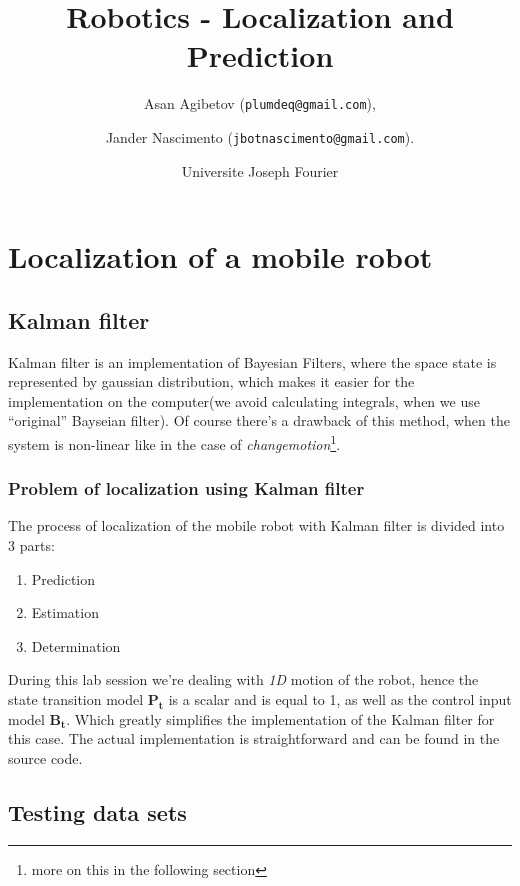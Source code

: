 \documentclass{article}
\begin{document}
\title{Robotics - Localization and Prediction}

\author{Asan Agibetov (\texttt{plumdeq@gmail.com}), 
\and Jander Nascimento (\texttt{jbotnascimento@gmail.com}).
\and Universite Joseph Fourier}

\maketitle

\section{Localization of a mobile robot}

\subsection{Kalman filter}
Kalman filter is an implementation of Bayesian Filters, where the space state is represented by gaussian distribution, which makes it easier for the implementation on the computer(we avoid calculating integrals, when we use ``original'' Bayseian filter). Of course there's a drawback of this method, when the system is non-linear like in the case of \textit{changemotion}\footnote{more on this in the following section}.
\subsubsection{Problem of localization using Kalman filter}
The process of localization of the mobile robot with Kalman filter is divided into 3 parts:
\begin{enumerate}
\item Prediction
\item Estimation
\item Determination
\end{enumerate}
During this lab session we're dealing with \textit{1D} motion of the robot, hence the state transition model $\mathbf{P_t}$ is a scalar and is equal to 1, as well as the control input model $\mathbf{B_t}$. Which greatly simplifies the implementation of the Kalman filter for this case. The actual implementation is straightforward and can be found in the source code.
\subsection{Testing data sets}
\end{document}
